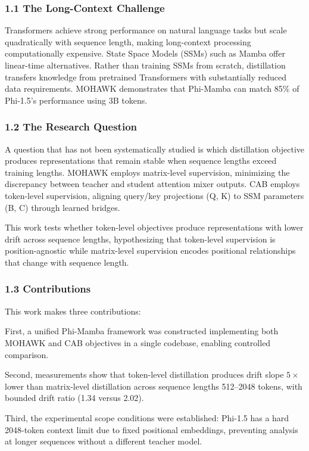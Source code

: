 
\subsubsection{1.1 The Long-Context Challenge}

Transformers achieve strong performance on natural language tasks but scale quadratically with sequence length, making long-context processing computationally expensive. State Space Models (SSMs) such as Mamba offer linear-time alternatives. Rather than training SSMs from scratch, distillation transfers knowledge from pretrained Transformers with substantially reduced data requirements. MOHAWK demonstrates that Phi-Mamba can match 85\% of Phi-1.5's performance using 3B tokens.

\subsubsection{1.2 The Research Question}

A question that has not been systematically studied is which distillation objective produces representations that remain stable when sequence lengths exceed training lengths. MOHAWK employs matrix-level supervision, minimizing the discrepancy between teacher and student attention mixer outputs. CAB employs token-level supervision, aligning query/key projections (Q, K) to SSM parameters (B, C) through learned bridges.

This work tests whether token-level objectives produce representations with lower drift across sequence lengths, hypothesizing that token-level supervision is position-agnostic while matrix-level supervision encodes positional relationships that change with sequence length.

\subsubsection{1.3 Contributions}

This work makes three contributions:

First, a unified Phi-Mamba framework was constructed implementing both MOHAWK and CAB objectives in a single codebase, enabling controlled comparison.

Second, measurements show that token-level distillation produces drift slope $5\times$ lower than matrix-level distillation across sequence lengths 512--2048 tokens, with bounded drift ratio (1.34 versus 2.02).

Third, the experimental scope conditions were established: Phi-1.5 has a hard 2048-token context limit due to fixed positional embeddings, preventing analysis at longer sequences without a different teacher model.

